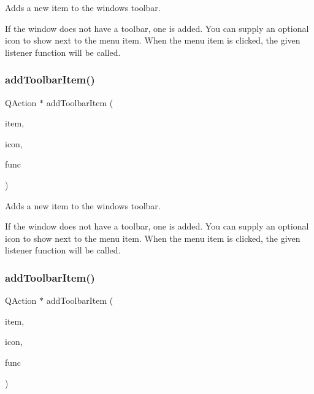 Adds a new item to the window\textquotesingle{}s toolbar. 

If the window does not have a toolbar, one is added. You can supply an optional icon to show next to the menu item. When the menu item is clicked, the given listener function will be called. \mbox{\label{classGWindow_a1cd26d8c9004f7cbd81cecfbd323f418}} 
\subsubsection{\texorpdfstring{add\+Toolbar\+Item()}{addToolbarItem()}\hspace{0.1cm}{\footnotesize\ttfamily [3/4]}}
{\footnotesize\ttfamily Q\+Action $\ast$ add\+Toolbar\+Item (\begin{DoxyParamCaption}\item[{const std\+::string \&}]{item,  }\item[{const Q\+Icon \&}]{icon,  }\item[{G\+Event\+Listener\+Void}]{func }\end{DoxyParamCaption})\hspace{0.3cm}{\ttfamily [virtual]}}



Adds a new item to the window\textquotesingle{}s toolbar. 

If the window does not have a toolbar, one is added. You can supply an optional icon to show next to the menu item. When the menu item is clicked, the given listener function will be called. \mbox{\label{classGWindow_a6daacc5873dd3a11813a68fcf88c9d6e}} 
\subsubsection{\texorpdfstring{add\+Toolbar\+Item()}{addToolbarItem()}\hspace{0.1cm}{\footnotesize\ttfamily [4/4]}}
{\footnotesize\ttfamily Q\+Action $\ast$ add\+Toolbar\+Item (\begin{DoxyParamCaption}\item[{const std\+::string \&}]{item,  }\item[{const Q\+Pixmap \&}]{icon,  }\item[{G\+Event\+Listener\+Void}]{func }\end{DoxyParamCaption})\hspace{0.3cm}{\ttfamily [virtual]}}



